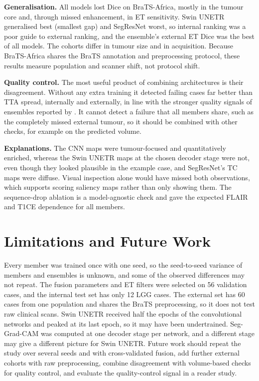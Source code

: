 \documentclass[a4paper,fleqn]{cas-sc}
\begin{document}
\textbf{Generalisation.} All models lost Dice on BraTS-Africa, mostly in the tumour core and, through missed enhancement, in ET sensitivity. Swin UNETR generalised best (smallest gap) and SegResNet worst, so internal ranking was a poor guide to external ranking, and the ensemble's external ET Dice was the best of all models. The cohorts differ in tumour size and in acquisition. Because BraTS-Africa shares the BraTS annotation and preprocessing protocol, these results measure population and scanner shift, not protocol shift.

\textbf{Quality control.} The most useful product of combining architectures is their disagreement. Without any extra training it detected failing cases far better than TTA spread, internally and externally, in line with the stronger quality signals of ensembles reported by \citet{mehrtash2020}. It cannot detect a failure that all members share, such as the completely missed external tumour, so it should be combined with other checks, for example on the predicted volume.

\textbf{Explanations.} The CNN maps were tumour-focused and quantitatively enriched, whereas the Swin UNETR maps at the chosen decoder stage were not, even though they looked plausible in the example case, and SegResNet's TC maps were diffuse. Visual inspection alone would have missed both observations, which supports scoring saliency maps rather than only showing them. The sequence-drop ablation is a model-agnostic check and gave the expected FLAIR and T1CE dependence for all members.

\section{Limitations and Future Work}
\label{sec:limitations}

Every member was trained once with one seed, so the seed-to-seed variance of members and ensembles is unknown, and some of the observed differences may not repeat. The fusion parameters and ET filters were selected on 56 validation cases, and the internal test set has only 12 LGG cases. The external set has 60 cases from one population and shares the BraTS preprocessing, so it does not test raw clinical scans. Swin UNETR received half the epochs of the convolutional networks and peaked at its last epoch, so it may have been undertrained. Seg-Grad-CAM was computed at one decoder stage per network, and a different stage may give a different picture for Swin UNETR. Future work should repeat the study over several seeds and with cross-validated fusion, add further external cohorts with raw preprocessing, combine disagreement with volume-based checks for quality control, and evaluate the quality-control signal in a reader study.
\end{document}
